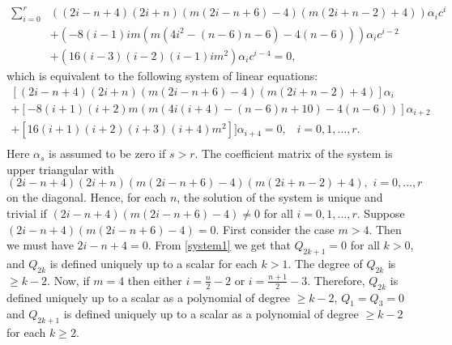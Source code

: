 \documentclass[review,nopreprintline]{elsarticle}
\theoremstyle{definition}
\numberwithin{equation}{section}
\theoremstyle{remark}
\begin{document}
	            \begin{align*}
	                \sum _{i=0}^r &((2 i-n+4) (2 i+n) (m (2 i-n+6)-4) (m (2 i+n-2)+4))\alpha_ic^{i}\\
	                &+(-8 (i-1) i m \left(m \left(4 i^2-(n-6) n-6\right)-4 (n-6)\right))\alpha_ic^{i-2}\\
	                &+(16 (i-3) (i-2) (i-1) i m^2)\alpha_ic^{i-4}=0,
	            \end{align*}
	            which is equivalent to the following system of linear equations:
	            \begin{equation}
	                \label{system1}
	                \begin{array}{c}
	                    [(2 i-n+4) (2 i+n) (m (2 i-n+6)-4) (m (2 i+n-2)+4)]\alpha_i\\
	                    +[-8 (i+1) (i+2) m (m (4 i (i+4)-(n-6) n+10)-4 (n-6))]\alpha_{i+2}\\
	                    +[16 (i+1) (i+2) (i+3) (i+4) m^2]]\alpha_{i+4}=0,\,\,\,\,\, i=0,1, \ldots, r.\\
	                \end{array}
	            \end{equation}
	            Here $\alpha_s$ is assumed to be zero if $s>r$. The coefficient matrix of the system is upper triangular 
	            with 
	            $$(2 i-n+4) (2 i+n) (m (2 i-n+6)-4) (m (2 i+n-2)+4), \,\, i=0, \ldots, r$$ 
	            on the diagonal. Hence, for each $n$, the solution of the system is unique and trivial if $(2 i-n+4) (m (2 i-n+6)-4)\neq 0$ for all $i=0,1, \ldots, r$. Suppose $(2 i-n+4) (m (2 i-n+6)-4)= 0$. First consider the case $m>4$. Then  we must have $2i-n+4=0$.  From \eqref{system1} we get that  $Q_{2k+1}=0$ for all $k>0$, and $Q_{2k}$ is defined  uniquely up to a scalar for each $k>1$. The degree of 
	      $Q_{2k}$ is $\geq k-2$.   Now, if $m=4$ then either   $i=\frac{n}{2}-2$ or   $i=\frac{n+1}{2}-3$. Therefore, 
	       $Q_{2k}$ is defined uniquely up to a scalar   as a   polynomial of degree $\geq k-2$, $Q_1=Q_3=0$ and  $Q_{2k+1}$ is defined uniquely up to a scalar   as a   polynomial of degree $\geq k-2$ for each $k\geq 2$.
	            
\end{document}
